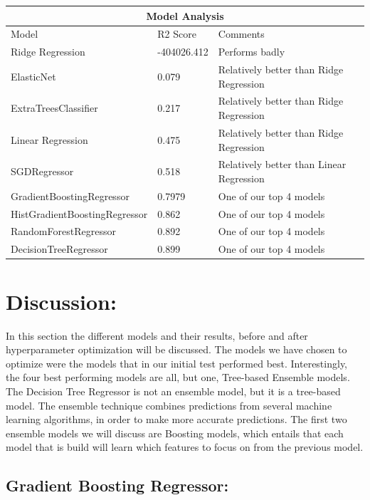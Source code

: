 \documentclass{article}
\begin{document}
\begin{tabular}{ |p{5cm}||p{3cm}||p{5cm}|  }
 \hline
 \multicolumn{3}{|c|}{Model Analysis} \\
 \hline
 \hline
Model   & R2 Score & Comments\\
 \hline
 \hline
 Ridge Regression   & -404026.412 & Performs badly  \\
   \hline
 ElasticNet  & 0.079 & Relatively better than Ridge Regression \\
  \hline
   ExtraTreesClassifier & 0.217 & Relatively better than Ridge Regression \\
 \hline
  Linear Regression   & 0.475 & Relatively better than Ridge Regression \\
  \hline
SGDRegressor   & 0.518 & Relatively better than Linear Regression \\
  \hline
  GradientBoostingRegressor & 0.7979 &  One of our top 4 models \\
   \hline
  HistGradientBoostingRegressor & 0.862 &  One of our top 4 models \\
  \hline
  RandomForestRegressor & 0.892 &  One of our top 4 models \\
  \hline
   DecisionTreeRegressor & 0.899&  One of our top 4 models \\
  \hline
\end{tabular}

\section{Discussion:}

In this section the different models and their results, before and after hyperparameter optimization will be discussed. The models we have chosen to optimize were the models that in our initial test performed best. Interestingly, the four best performing models are all, but one, Tree-based Ensemble models. The Decision Tree Regressor is not an ensemble model, but it is a tree-based model. The ensemble technique combines predictions from several machine learning algorithms, in order to make more accurate predictions. 
The first two ensemble models we will discuss are Boosting models, which entails that each model that is build will learn which features to focus on from the previous model. 

\subsection{Gradient Boosting Regressor:}
\end{document}
